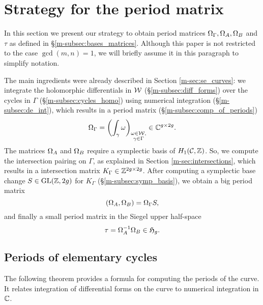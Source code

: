 \documentclass[main.tex]{subfiles}
\begin{document}
  \section{Strategy for the period matrix}\label{sec:strat_pm}

  In this section we present our strategy to obtain period matrices $\Omega_{\Gamma}, \Omega_A, \Omega_B$ and $\tau$ as defined in
  \S \ref{m-subsec:bases_matrices}. Although this paper is not restricted to the
  case $\gcd(m,n) = 1$, we will briefly assume it in this paragraph to simplify notation.

  The main ingredients were already described in
  Section \ref{m-sec:se_curves}: we integrate the holomorphic differentials in $\mathcal{W}$ (\S \ref{m-subsec:diff_forms})
  over the cycles in $\Gamma$ (\S \ref{m-subsec:cycles_homo}) using numerical integration (\S \ref{m-subsec:de_int}), which results in a period matrix (\S \ref{m-subsec:comp_of_periods})
  \begin{equation*}
      \label{eq:OC}
    \Omega_{\Gamma} = \left( \int_{\gamma} \omega \right)_{\substack{\omega \in \mathcal{W}, \\ \gamma \in \Gamma}} \in \mathbb{C}^{g \times 2g}.
  \end{equation*}
  The matrices $\Omega_A$ and $\Omega_B$ require a symplectic basis of $H_1(\mathcal{C},\mathbb{Z})$.
  So, we compute the intersection pairing on $\Gamma$, as explained in Section \ref{m-sec:intersections}, which results in a
  intersection matrix $K_{\Gamma} \in \mathbb{Z}^{2g \times 2g}$.
  After computing a symplectic base change $S \in \operatorname{GL}(\mathbb{Z},2g)$ for $K_{\Gamma}$ (\S \ref{m-subsec:symp_basis}), we obtain a big period matrix
  \begin{equation}
      \label{eq:OAOB}
      (\Omega_A,\Omega_B) = \Omega_{\Gamma} S,
  \end{equation}
   and finally a small period matrix in the Siegel upper half-space
  \begin{equation}
      \label{eq:tau}
   \tau = \Omega_A^{-1} \Omega_B \in \mathfrak{H}_g.
  \end{equation}

  \bigskip

  \subsection{Periods of elementary cycles}\label{subsec:comp_of_periods}

  The following theorem provides a formula for computing the periods of the curve.
  It relates integration of differential forms on the curve to numerical integration in $\mathbb{C}$.
\end{document}
